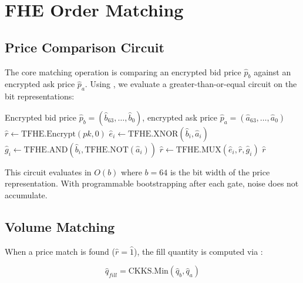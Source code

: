 \section{FHE Order Matching}

\label{sec:matching}

\subsection{Price Comparison Circuit}

The core matching operation is comparing an encrypted bid price $\hat{p}_b$ against an encrypted ask price $\hat{p}_a$. Using \TFHE{}, we evaluate a greater-than-or-equal circuit on the bit representations:

\begin{algorithm}
\caption{Encrypted Price Comparison (\TFHE{})}
\begin{algorithmic}[1]
\REQUIRE Encrypted bid price $\hat{p}_b = (\hat{b}_{63}, \ldots, \hat{b}_0)$, encrypted ask price $\hat{p}_a = (\hat{a}_{63}, \ldots, \hat{a}_0)$
\STATE $\hat{r} \leftarrow \text{TFHE.Encrypt}(pk, 0)$ 
    \STATE $\hat{e}_i \leftarrow \text{TFHE.XNOR}(\hat{b}_i, \hat{a}_i)$ 
    \STATE $\hat{g}_i \leftarrow \text{TFHE.AND}(\hat{b}_i, \text{TFHE.NOT}(\hat{a}_i))$ 
    \STATE $\hat{r} \leftarrow \text{TFHE.MUX}(\hat{e}_i, \hat{r}, \hat{g}_i)$ 
\ENDFOR
\RETURN $\hat{r}$ 
\end{algorithmic}
\end{algorithm}

This circuit evaluates in $O(b)$ where $b = 64$ is the bit width of the price representation. With programmable bootstrapping after each gate, noise does not accumulate.

\subsection{Volume Matching}

When a price match is found ($\hat{r} = \hat{1}$), the fill quantity is computed via \CKKS{}:

\begin{equation}
\hat{q}_{\textit{fill}} = \text{CKKS.Min}(\hat{q}_b, \hat{q}_a)
\end{equation}

